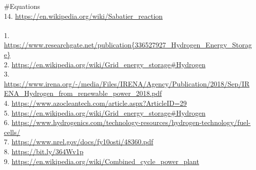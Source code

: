 \begin{parcolumns}[colwidths={1=2.5 cm, 2=12 cm}]{2}
{{\#Equations}\\
14. \url{https://en.wikipedia.org/wiki/Sabatier\_reaction}\\
\\
1. \url{https://www.researchgate.net/publication{336527927_Hydrogen_Energy_Storage}} \\
2. \url{https://en.wikipedia.org/wiki/Grid_energy_storage#Hydrogen} \\
3. \url{https://www.irena.org/-/media/Files/IRENA/Agency/Publication/2018/Sep/IRENA_Hydrogen_from_renewable_power_2018.pdf} \\
4. \url{https://www.azocleantech.com/article.aspx?ArticleID=29} \\
5. \url{https://en.wikipedia.org/wiki/Grid_energy_storage#Hydrogen} \\
6. \url{https://www.hydrogenics.com/technology-resources/hydrogen-technology/fuel-cells/} \\
7. \url{https://www.nrel.gov/docs/fy10osti/48360.pdf} \\
8. \url{https://bit.ly/364Wv1p} \\
9. \url{https://en.wikipedia.org/wiki/Combined_cycle_power_plant} \\
}

\end{parcolumns}
\clearpage